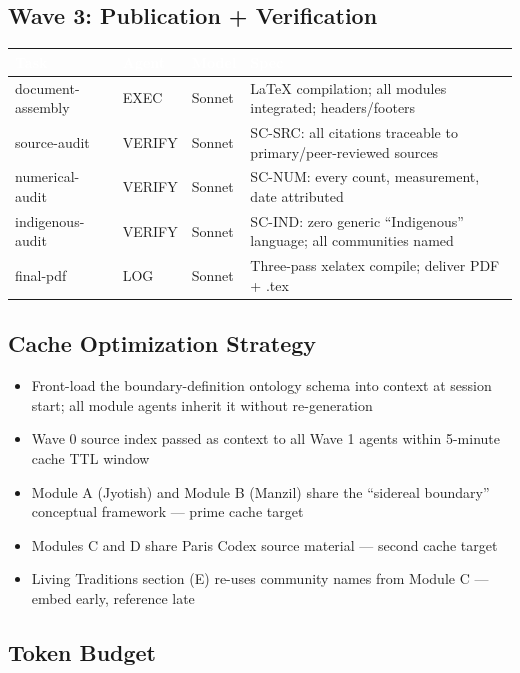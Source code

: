 \documentclass[11pt,letterpaper]{article}
\newcommand{\tableheader}[1]{\textbf{\sffamily\textcolor{white}{#1}}}
\begin{document}
\subsection{Wave 3: Publication + Verification}

\begin{center}
\begin{tabularx}{\textwidth}{L{3cm}L{2cm}L{2cm}X}
\toprule
{}
\tableheader{Task} & \tableheader{Agent} & \tableheader{Model} & \tableheader{Spec} \\
\midrule
document-assembly & EXEC & Sonnet & LaTeX compilation; all modules integrated; headers/footers \\
source-audit & VERIFY & Sonnet & SC-SRC: all citations traceable to primary/peer-reviewed sources \\
numerical-audit & VERIFY & Sonnet & SC-NUM: every count, measurement, date attributed \\
indigenous-audit & VERIFY & Sonnet & SC-IND: zero generic ``Indigenous'' language; all communities named \\
final-pdf & LOG & Sonnet & Three-pass xelatex compile; deliver PDF + .tex \\
\bottomrule
\end{tabularx}
\end{center}

\subsection{Cache Optimization Strategy}

\begin{itemize}[leftmargin=1.5em]
  \item Front-load the boundary-definition ontology schema into context at session start; all module agents inherit it without re-generation
  \item Wave 0 source index passed as context to all Wave 1 agents within 5-minute cache TTL window
  \item Module A (Jyotish) and Module B (Manzil) share the ``sidereal boundary'' conceptual framework --- prime cache target
  \item Modules C and D share Paris Codex source material --- second cache target
  \item Living Traditions section (E) re-uses community names from Module C --- embed early, reference late
\end{itemize}

\subsection{Token Budget}
\end{document}
